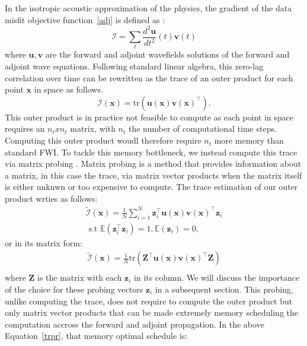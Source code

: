 \documentclass[]{segabs}
\begin{document}
In the isotropic acoustic approximation of the physics, the gradient of
the data misfit objective function~\ref{adj} is defined as
\citep{haber10tremp}:
%
\begin{equation}
\mathcal{I} = \sum_t \frac{d^2 \mathbf{u}}{dt^2}(t) \mathbf{v}(t)
\label{iccc}
\end{equation}
%
 where $\mathbf{u}, \mathbf{v}$ are the forward and adjoint wavefields
solutions of the forward and adjoint wave equations. Following standard
linear algebra, this zero-lag correlation over time can be rewritten as
the trace of an outer product for each point $\mathbf{x}$ in space as
follows.
%
\begin{equation}
\mathcal{I}(\mathbf{x}) = \text{tr}(\mathbf{u}(\mathbf{x})\mathbf{v}(\mathbf{x})^\top).
\label{optr}
\end{equation}
%
 This outer product is in practice not feasible to compute as each point
in space requires an $n_t x n_t$ matrix, with $n_t$ the number of
computational time steps. Computing this outer product woudl therefore
require $n_t$ more memory than standard FWI. To tackle this memory
bottleneck, we instead compute this trace via matrix probing
\citep[\citet{hutcpp}]{Avron}. Matrix probing is a method that provides
information about a matrix, in this case the trace, via matrix vector
products when the matrix itself is either unknwn or too expensive to
compute. The trace estimation of our outer product wrties as follows:
%
\begin{equation}
\begin{split}
    \tilde{\mathcal{I}}(\mathbf{x}) = \frac{1}{N} \sum_{i=1}^{N} \mathbf{z}_i^\top \mathbf{u}(\mathbf{x})\mathbf{v}(\mathbf{x})^\top \mathbf{z}_i \\
    \text{ s.t } \mathbb{E}(\mathbf{z}_i^\top \mathbf{z}_i) = 1, \mathbb{E}(\mathbf{z}_i) = 0,
\end{split}
\label{trpr}
\end{equation}
%
 or in its matrix form:
%
\begin{equation}
\begin{split}
    \tilde{\mathcal{I}}(\mathbf{x}) = \frac{1}{N} \text{tr}(\mathbf{Z}^\top \mathbf{u}(\mathbf{x}) \mathbf{v}(\mathbf{x})^\top \mathbf{Z}) \\
\end{split}
\label{trprM}
\end{equation}
%
 where $\mathbf{Z}$ is the matrix with each $\mathbf{z}_i$ in its
column. We will discuss the importance of the choice for these probing
vectors $\mathbf{z}_i$ in a subsequent section. This probing, unlike
computing the trace, does not require to compute the outer product but
only matrix vector products that can be made extremely memory scheduling
the computation accross the forward and adjoint propagation. In the
above Equation~\ref{trpr}, that memory optimal schedule is:
\end{document}
